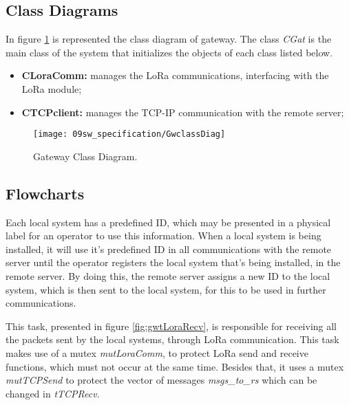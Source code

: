 \subsection{Class Diagrams}
In figure \ref{fig:GwclassDiag} is represented the class diagram of gateway. The class \textit{CGat} is the main class of the system that initializes the objects of each class listed below.

\begin{itemize}
	\item \textbf{CLoraComm:} manages the LoRa communications, interfacing with the LoRa module;
	
	\item \textbf{CTCPclient:} manages the TCP-IP communication with the remote server;
\end{itemize}

\begin{figure}[H]
	\centering
	\texttt{[image: 09sw\_specification/GwclassDiag]}
	\caption{Gateway Class Diagram.}
	\label{fig:GwclassDiag}
\end{figure}


\subsection{Flowcharts}
Each local system has a predefined ID, which may be presented in a physical label for an operator to use this information. When a local system is being installed, it will use it's predefined ID in all communications with the remote server until the operator registers the local system that's being installed, in the remote server. By doing this, the remote server assigns a new ID to the local system, which is then sent to the local system, for this to be used in further communications.


This task, presented in figure \ref{fig:gwtLoraRecv}, is responsible for receiving all the packets sent by the local systems, through LoRa communication. This task makes use of a mutex \textit{mutLoraComm}, to protect LoRa send and receive functions, which must not occur at the same time. Besides that, it uses a mutex \textit{mutTCPSend} to protect the vector of messages \textit{msgs\_to\_rs} which can be changed in \textit{tTCPRecv}.

